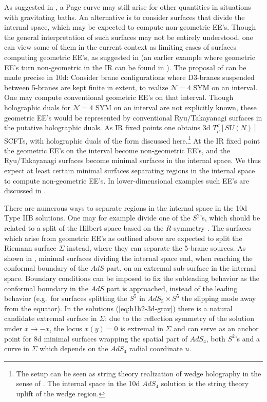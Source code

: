 \documentclass[aps,prd,11pt,notitlepage,longbibliography,nofootinbib,tightenlines,preprintnumbers]{revtex4-1}
\begin{document}
As suggested in \cite{Laddha:2020kvp}, a Page curve may still arise for other quantities in situations with gravitating baths.
An alternative is to consider surfaces that divide the internal space, which may be expected to compute non-geometric EE's.
Though the general interpretation of such surfaces may not be entirely understood, one can view some of them in the current context as limiting cases of surfaces computing geometric EE's, as suggested in \cite{Geng:2020fxl} (an earlier example where geometric EE's turn non-geometric in the IR can be found in \cite{Balasubramanian:2017hgy}). The proposal of  \cite{Geng:2020fxl}  can be made precise in 10d: Consider brane configurations where D3-branes suspended between 5-branes are kept finite in extent, to realize $\mathcal N=4$ SYM on an interval. One may compute conventional geometric EE's on that interval. Though holographic duals for $\mathcal N=4$ SYM on an interval are not explicitly known, these geometric EE's would be represented by conventional Ryu/Takayanagi surfaces in the putative holographic duals. 
As IR fixed points one obtains 3d $T_\rho^\sigma[SU(N)]$ SCFTs, with holographic duals of the form discussed here.\footnote{
The setup can be seen as string theory realization of wedge holography in the sense of \cite{Akal:2020wfl}. The internal space in the 10d $AdS_4$ solution is the string theory uplift of the wedge region.
}
At the IR fixed point the geometric EE's on the interval become non-geometric EE's, and the Ryu/Takayanagi surfaces become minimal surfaces in the internal space.
We thus expect at least certain minimal surfaces separating regions in the internal space to compute non-geometric EE's.
In lower-dimensional examples such EE's are discussed in \cite{Geng:2021iyq}.

There are numerous ways to separate regions in the internal space in the 10d Type IIB solutions.
One may for example divide one of the $S^2$'s, which should be related to a split of the Hilbert space based on the $R$-symmetry  \cite{Karch:2014pma}. The surfaces which arise from geometric EE's as outlined above are expected to split the Riemann surface $\Sigma$ instead, where they can separate the 5-brane sources.
%
As shown in  \cite{Graham:2014iya}, minimal surfaces dividing the internal space end, when reaching the conformal boundary of the $AdS$ part, on an extremal sub-surface in the internal space. Boundary conditions can be imposed to fix the subleading behavior as the conformal boundary in the $AdS$ part is approached, instead of the leading behavior (e.g.\ for surfaces splitting the $S^5$ in $AdS_5\times S^5$ the slipping mode away from the equator).
In the solutions (\ref{eq:h1h2-3d-grav}) there is a natural candidate extremal surface in $\Sigma$: due to the reflection symmetry of the solution under $x\rightarrow -x$, the locus $x(y)=0$ is extremal in $\Sigma$ and can serve as an anchor point for 8d minimal surfaces wrapping the spatial part of $AdS_4$, both $S^2$'s and a curve in $\Sigma$ which depends on the $AdS_4$ radial coordinate $u$.
\end{document}
